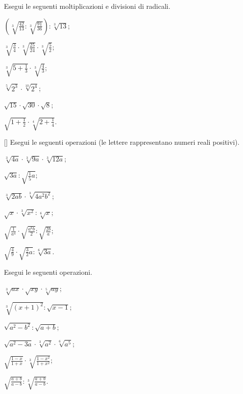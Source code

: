\begin{esercizio}[\Ast]
 \label{ese:2.39}
Esegui le seguenti moltiplicazioni e divisioni di radicali.
 \begin{multicols}{3}
 \begin{enumeratea}
 \item $\left(\sqrt[3]{\frac{42}{13}}:\sqrt[3]{\frac{91}{36}}\right):\sqrt[3]{13}$;
 \item $\sqrt[3]{\frac 3 4}\cdot \sqrt[3]{\frac{25}{24}}\cdot \sqrt[3]{\frac 5 2}$;
 \item $\sqrt[3]{5+\frac 1 3}\cdot \sqrt[3]{\frac 4 3}$;
 \item $\sqrt[5]{2^3}\cdot \sqrt[10]{2^4}$;
 \item $\sqrt{15}\cdot \sqrt{30}\cdot \sqrt 8$;
 \item $\sqrt{1+\frac 1 2}\cdot \sqrt[4]{2+\frac 1 4}$.
 \end{enumeratea}
 \end{multicols}
\end{esercizio}
\pagebreak
\begin{esercizio}
 \label{ese:2.40}[\Ast]
Esegui le seguenti operazioni (le lettere rappresentano numeri reali positivi).
 \begin{multicols}{3}
 \begin{enumeratea}
 \item $\sqrt[3]{4a}\cdot \sqrt[3]{9a}\cdot \sqrt[3]{12a}$;
 \item $\sqrt{3a}:\sqrt{\frac 1 5a}$;
 \item $\sqrt[3]{2ab}\cdot \sqrt[3]{4a^2b^2}$;
 \item $\sqrt x\cdot \sqrt[3]{x^2}:\sqrt[6]x$;
 \item $\sqrt{\frac 1{a^4}}\cdot \sqrt{\frac{a^6b} 2}:\sqrt{\frac{2b} a}$;
 \item $\sqrt{\frac 4 9}\cdot \sqrt{\frac 3 2a}:\sqrt[6]{3a}$.
 \end{enumeratea}
 \end{multicols}
\end{esercizio}

\begin{esercizio}[\Ast]
 \label{ese:2.41}
Esegui le seguenti operazioni.
 \begin{multicols}{3}
 \begin{enumeratea}
 \item $\sqrt[3]{ax}\cdot \sqrt{xy}\cdot \sqrt[5]{ay}$;
 \item $\sqrt[3]{(x+1)^2}:\sqrt{x-1}$;
 \item $\sqrt{a^2-b^2}:\sqrt{a+b}$;
 \item $\sqrt{a^2-3a}\cdot \sqrt[3]{a^2}\cdot \sqrt[6]{a^5}$;
 \item $\sqrt{\frac{1-x}{1+x}}\cdot \sqrt[3]{\frac{1-x^2}{1+x^2}}$;
 \item $\sqrt{\frac{a+b}{a-b}}:\sqrt[3]{\frac{a+b}{a-b}}$.
 \end{enumeratea}
 \end{multicols}
\end{esercizio}

